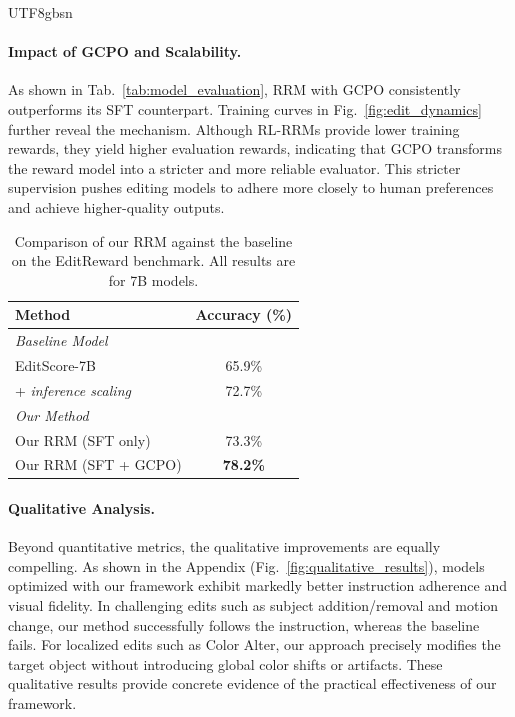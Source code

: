\documentclass{llmxive}
\providecommand{\arraystretch}{1.25}
\begin{document}
\begin{CJK*}{UTF8}{gbsn}
\paragraph{Impact of GCPO and Scalability.} 
As shown in Tab.~\ref{tab:model_evaluation}, RRM with GCPO consistently outperforms its SFT counterpart. Training curves in Fig.~\ref{fig:edit_dynamics} further reveal the mechanism. Although RL-RRMs provide lower training rewards, they yield higher evaluation rewards, indicating that GCPO transforms the reward model into a stricter and more reliable evaluator. This stricter supervision pushes editing models to adhere more closely to human preferences and achieve higher-quality outputs.
\begin{table}[t!]
    \centering
    \renewcommand{\arraystretch}{1.15}
    \small
    \begin{tabular}{lc}
        \toprule
        \textbf{Method} & \textbf{Accuracy (\%)} \\
        \midrule
        \multicolumn{2}{l}{\textit{Baseline Model}} \\
        EditScore-7B & 65.9\% \\
        \quad + \textit{inference scaling} & 72.7\% \\
        \midrule
        \multicolumn{2}{l}{\textit{Our Method}} \\
        Our RRM (SFT only) & 73.3\% \\
        Our RRM (SFT + GCPO) & \textbf{78.2\%} \\
        \bottomrule
    \end{tabular}
\caption{Comparison of our RRM against the baseline on the EditReward benchmark. All results are for 7B models.}
\label{tab:editscore_benchmark_comparison}
\end{table}
\paragraph{Qualitative Analysis.} 
Beyond quantitative metrics, the qualitative improvements are equally compelling. As shown in the Appendix (Fig.~\ref{fig:qualitative_results}), models optimized with our framework exhibit markedly better instruction adherence and visual fidelity. 
In challenging edits such as subject addition/removal and motion change, our method successfully follows the instruction, whereas the baseline fails. For localized edits such as Color Alter, our approach precisely modifies the target object without introducing global color shifts or artifacts. These qualitative results provide concrete evidence of the practical effectiveness of our framework.



\end{CJK*}
\end{document}
